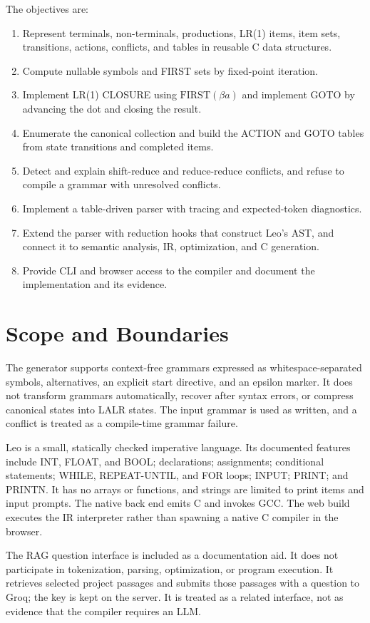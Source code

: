 \documentclass[12pt,a4paper,oneside]{report}
\begin{document}
The objectives are:
\begin{enumerate}
  \item Represent terminals, non-terminals, productions, LR(1) items, item sets, transitions, actions, conflicts, and tables in reusable C data structures.
  \item Compute nullable symbols and FIRST sets by fixed-point iteration.
  \item Implement LR(1) CLOSURE using $\mathrm{FIRST}(\beta a)$ and implement GOTO by advancing the dot and closing the result.
  \item Enumerate the canonical collection and build the ACTION and GOTO tables from state transitions and completed items.
  \item Detect and explain shift-reduce and reduce-reduce conflicts, and refuse to compile a grammar with unresolved conflicts.
  \item Implement a table-driven parser with tracing and expected-token diagnostics.
  \item Extend the parser with reduction hooks that construct Leo's AST, and connect it to semantic analysis, IR, optimization, and C generation.
  \item Provide CLI and browser access to the compiler and document the implementation and its evidence.
\end{enumerate}

\section{Scope and Boundaries}
The generator supports context-free grammars expressed as whitespace-separated symbols, alternatives, an explicit start directive, and an epsilon marker. It does not transform grammars automatically, recover after syntax errors, or compress canonical states into LALR states. The input grammar is used as written, and a conflict is treated as a compile-time grammar failure.

Leo is a small, statically checked imperative language. Its documented features include INT, FLOAT, and BOOL; declarations; assignments; conditional statements; WHILE, REPEAT-UNTIL, and FOR loops; INPUT; PRINT; and PRINTN. It has no arrays or functions, and strings are limited to print items and input prompts. The native back end emits C and invokes GCC. The web build executes the IR interpreter rather than spawning a native C compiler in the browser.

The RAG question interface is included as a documentation aid. It does not participate in tokenization, parsing, optimization, or program execution. It retrieves selected project passages and submits those passages with a question to Groq; the key is kept on the server. It is treated as a related interface, not as evidence that the compiler requires an LLM.
\end{document}
